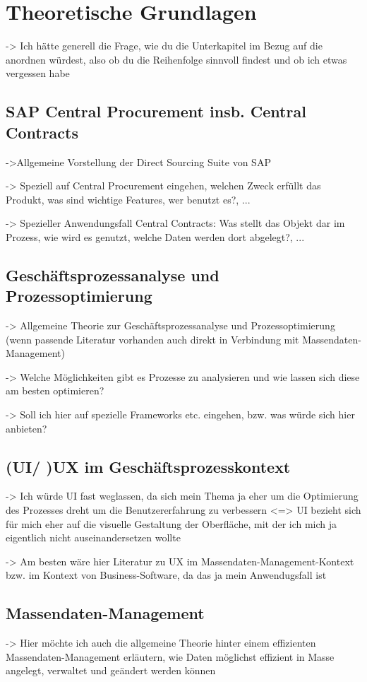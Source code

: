 \chapter{Theoretische Grundlagen}

-> Ich hätte generell die Frage, wie du die Unterkapitel im Bezug auf die anordnen würdest, also ob du die Reihenfolge sinnvoll findest und ob ich etwas vergessen habe

\section{SAP Central Procurement insb. Central Contracts}

->Allgemeine Vorstellung der Direct Sourcing Suite von SAP

-> Speziell auf Central Procurement eingehen, welchen Zweck erfüllt das Produkt, was sind wichtige Features, wer benutzt es?, ...

-> Spezieller Anwendungsfall Central Contracts: Was stellt das Objekt dar im Prozess, wie wird es genutzt, welche Daten werden dort abgelegt?, ...

\section{Geschäftsprozessanalyse und Prozessoptimierung}

-> Allgemeine Theorie zur Geschäftsprozessanalyse und Prozessoptimierung (wenn passende Literatur vorhanden auch direkt in Verbindung mit Massendaten-Management)

-> Welche Möglichkeiten gibt es Prozesse zu analysieren und wie lassen sich diese am besten optimieren?

-> Soll ich hier auf spezielle Frameworks etc. eingehen, bzw. was würde sich hier anbieten?

\section{(UI/ )UX im Geschäftsprozesskontext}

-> Ich würde UI fast weglassen, da sich mein Thema ja eher um die Optimierung des Prozesses dreht um die Benutzererfahrung zu verbessern <=> UI bezieht sich für mich eher auf die visuelle Gestaltung der Oberfläche, mit der ich mich ja eigentlich nicht auseinandersetzen wollte

-> Am besten wäre hier Literatur zu UX im Massendaten-Management-Kontext bzw. im Kontext von Business-Software, da das ja mein Anwendugsfall ist

\section{Massendaten-Management}

-> Hier möchte ich auch die allgemeine Theorie hinter einem effizienten Massendaten-Management erläutern, wie Daten möglichst effizient in Masse angelegt, verwaltet und geändert werden können